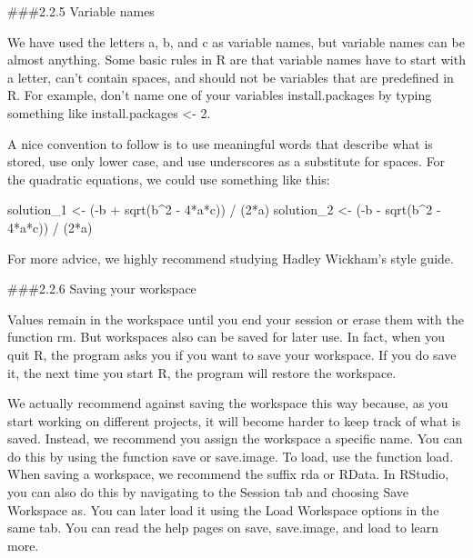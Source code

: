 \documentclass[
]{article}
\newenvironment{Shaded}{\begin{snugshade}}{\end{snugshade}}
\newcommand{\DecValTok}[1]{\textcolor[rgb]{0.00,0.00,0.81}{#1}}
\newcommand{\FunctionTok}[1]{\textcolor[rgb]{0.00,0.00,0.00}{#1}}
\newcommand{\NormalTok}[1]{#1}
\newcommand{\OtherTok}[1]{\textcolor[rgb]{0.56,0.35,0.01}{#1}}
\newcommand{\SpecialCharTok}[1]{\textcolor[rgb]{0.00,0.00,0.00}{#1}}
\begin{document}
\#\#\#2.2.5 Variable names

We have used the letters a, b, and c as variable names, but variable
names can be almost anything. Some basic rules in R are that variable
names have to start with a letter, can't contain spaces, and should not
be variables that are predefined in R. For example, don't name one of
your variables install.packages by typing something like
install.packages \textless- 2.

A nice convention to follow is to use meaningful words that describe
what is stored, use only lower case, and use underscores as a substitute
for spaces. For the quadratic equations, we could use something like
this:

\begin{Shaded}
\begin{Highlighting}[]
\NormalTok{solution\_1 }\OtherTok{\textless{}{-}}\NormalTok{ (}\SpecialCharTok{{-}}\NormalTok{b }\SpecialCharTok{+} \FunctionTok{sqrt}\NormalTok{(b}\SpecialCharTok{\^{}}\DecValTok{2} \SpecialCharTok{{-}} \DecValTok{4}\SpecialCharTok{*}\NormalTok{a}\SpecialCharTok{*}\NormalTok{c)) }\SpecialCharTok{/}\NormalTok{ (}\DecValTok{2}\SpecialCharTok{*}\NormalTok{a)}
\NormalTok{solution\_2 }\OtherTok{\textless{}{-}}\NormalTok{ (}\SpecialCharTok{{-}}\NormalTok{b }\SpecialCharTok{{-}} \FunctionTok{sqrt}\NormalTok{(b}\SpecialCharTok{\^{}}\DecValTok{2} \SpecialCharTok{{-}} \DecValTok{4}\SpecialCharTok{*}\NormalTok{a}\SpecialCharTok{*}\NormalTok{c)) }\SpecialCharTok{/}\NormalTok{ (}\DecValTok{2}\SpecialCharTok{*}\NormalTok{a)}
\end{Highlighting}
\end{Shaded}

For more advice, we highly recommend studying Hadley Wickham's style
guide.

\#\#\#2.2.6 Saving your workspace

Values remain in the workspace until you end your session or erase them
with the function rm. But workspaces also can be saved for later use. In
fact, when you quit R, the program asks you if you want to save your
workspace. If you do save it, the next time you start R, the program
will restore the workspace.

We actually recommend against saving the workspace this way because, as
you start working on different projects, it will become harder to keep
track of what is saved. Instead, we recommend you assign the workspace a
specific name. You can do this by using the function save or save.image.
To load, use the function load. When saving a workspace, we recommend
the suffix rda or RData. In RStudio, you can also do this by navigating
to the Session tab and choosing Save Workspace as. You can later load it
using the Load Workspace options in the same tab. You can read the help
pages on save, save.image, and load to learn more.
\end{document}
